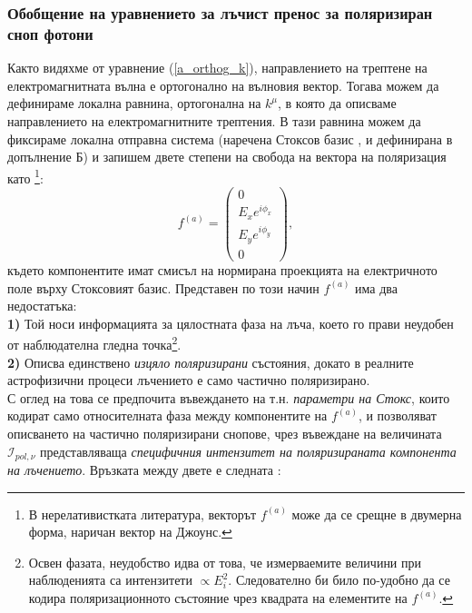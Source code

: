 \subsubsection{Обобщение на уравнението за лъчист пренос за поляризиран сноп фотони}

Както видяхме от уравнение (\ref{a_orthog_k}), направлението на трептене на електромагнитната вълна е ортогонално на вълновия вектор. Тогава можем да дефинираме локална равнина, ортогонална на $k^\mu$, в която да описваме направлението на електромагнитните трептения. В тази равнина можем да фиксираме локална отправна система (наречена Стоксов базис \cite{Bronzwaer2020}\cite{Ipole_Code}, и дефинирана в допълнение Б) и запишем двете степени на свобода на вектора на поляризация като \footnote{В нерелативистката литература, векторът $f^{(a)}$ може да се срещне в двумерна форма, наричан вектор на Джоунс.}:
\begin{equation}
f^{(a)} = \begin{pmatrix}
			0 \\
			E_{x} e^{i\phi_{x}} \\
			E_{y} e^{i\phi_{y}} \\
			0
	\end{pmatrix},
\end{equation}
където компонентите имат смисъл на нормирана проекцията на електричното поле върху Стоксовият базис. Представен по този начин $f^{(a)}$ има два недостатъка:\\

\noindent\textbf{1)} Той носи информацията за цялостната фаза на лъча, което го прави неудобен от наблюдателна гледна точка\footnote{Освен фазата, неудобство идва от това, че измерваемите величини при наблюденията са интензитети $\propto E_i^2$. Следователно би било по-удобно да се кодира поляризационното състояние чрез квадрата на елементите на $f^{(a)}$.}.\\

\noindent\textbf{2)} Описва единствено \emph{изцяло поляризирани} състояния, докато в реалните астрофизични процеси лъчението е само частично поляризирано.\\

\noindent С оглед на това се предпочита въвеждането на т.н. \emph{параметри на Стокс}, които кодират само относителната фаза между компонентите на $f^{(a)}$, и позволяват описването на частично поляризирани снопове, чрез въвеждане на величината $\mathcal{I}_{pol, \nu}$ представляваща \emph{специфичния интензитет на поляризираната компонента на лъчението}. Връзката между двете е следната \cite{Bronzwaer2020}:\\

